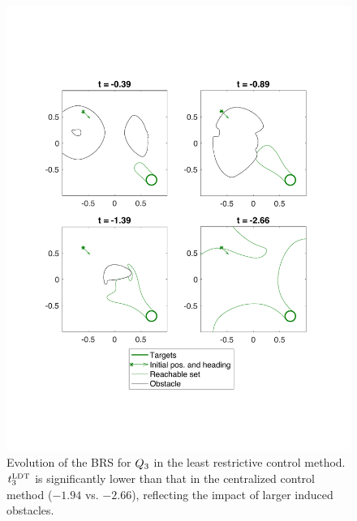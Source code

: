 \begin{figure}[H]
  \centering
  \includegraphics[width=\columnwidth]{"fig/lrc_rs3"}
  \caption{Evolution of the BRS for $Q_3$ in the least restrictive control method. $t^\text{LDT}_3$ is significantly lower than that in the centralized control method ($-1.94$ vs. $-2.66$), reflecting the impact of larger induced obstacles.}
  \label{fig:lrc_rs3}
\end{figure}